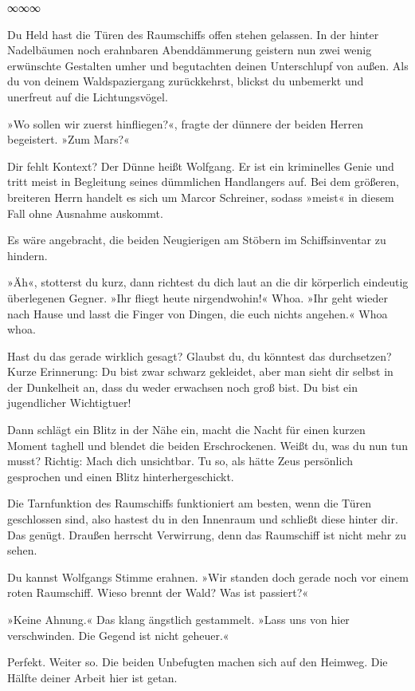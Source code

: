 \begin{center}
∞∞∞
\end{center}

Du Held hast die Türen des Raumschiffs offen stehen gelassen. In der hinter Nadelbäumen noch erahnbaren Abenddämmerung geistern nun zwei wenig erwünschte Gestalten umher und begutachten deinen Unterschlupf von außen. Als du von deinem Waldspaziergang zurückkehrst, blickst du unbemerkt und unerfreut auf die Lichtungsvögel.

»Wo sollen wir zuerst hinfliegen?«, fragte der dünnere der beiden Herren begeistert. »Zum Mars?«

Dir fehlt Kontext? Der Dünne heißt Wolfgang. Er ist ein kriminelles Genie und tritt meist in Begleitung seines dümmlichen Handlangers auf. Bei dem größeren, breiteren Herrn handelt es sich um Marcor Schreiner, sodass »meist« in diesem Fall ohne Ausnahme auskommt.

Es wäre angebracht, die beiden Neugierigen am Stöbern im Schiffsinventar zu hindern.

»Äh«, stotterst du kurz, dann richtest du dich laut an die dir körperlich eindeutig überlegenen Gegner. »Ihr fliegt heute nirgendwohin!« Whoa. »Ihr geht wieder nach Hause und lasst die Finger von Dingen, die euch nichts angehen.« Whoa whoa.

Hast du das gerade wirklich gesagt? Glaubst du, du könntest das durchsetzen? Kurze Erinnerung: Du bist zwar schwarz gekleidet, aber man sieht dir selbst in der Dunkelheit an, dass du weder erwachsen noch groß bist. Du bist ein jugendlicher Wichtigtuer!

Dann schlägt ein Blitz in der Nähe ein, macht die Nacht für einen kurzen Moment taghell und blendet die beiden Erschrockenen. Weißt du, was du nun tun musst? Richtig: Mach dich unsichtbar. Tu so, als hätte Zeus persönlich gesprochen und einen Blitz hinterhergeschickt.

Die Tarnfunktion des Raumschiffs funktioniert am besten, wenn die Türen geschlossen sind, also hastest du in den Innenraum und schließt diese hinter dir. Das genügt. Draußen herrscht Verwirrung, denn das Raumschiff ist nicht mehr zu sehen.

Du kannst Wolfgangs Stimme erahnen. »Wir standen doch gerade noch vor einem roten Raumschiff. Wieso brennt der Wald? Was ist passiert?«

»Keine Ahnung.« Das klang ängstlich gestammelt. »Lass uns von hier verschwinden. Die Gegend ist nicht geheuer.«

Perfekt. Weiter so. Die beiden Unbefugten machen sich auf den Heimweg. Die Hälfte deiner Arbeit hier ist getan.

